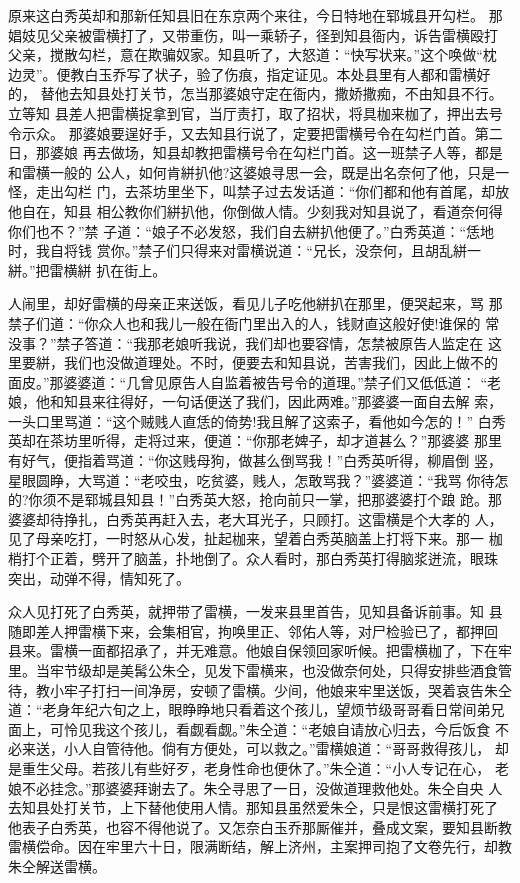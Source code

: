 原来这白秀英却和那新任知县旧在东京两个来往，今日特地在郓城县开勾栏。
那娼妓见父亲被雷横打了，又带重伤，叫一乘轿子，径到知县衙内，诉告雷横殴打
父亲，搅散勾栏，意在欺骗奴家。知县听了，大怒道：“快写状来。”这个唤做“枕
边灵”。便教白玉乔写了状子，验了伤痕，指定证见。本处县里有人都和雷横好的，
替他去知县处打关节，怎当那婆娘守定在衙内，撒娇撒痴，不由知县不行。立等知
县差人把雷横捉拿到官，当厅责打，取了招状，将具枷来枷了，押出去号令示众。
那婆娘要逞好手，又去知县行说了，定要把雷横号令在勾栏门首。第二日，那婆娘
再去做场，知县却教把雷横号令在勾栏门首。这一班禁子人等，都是和雷横一般的
公人，如何肯絣扒他?这婆娘寻思一会，既是出名奈何了他，只是一怪，走出勾栏
门，去茶坊里坐下，叫禁子过去发话道：“你们都和他有首尾，却放他自在，知县
相公教你们絣扒他，你倒做人情。少刻我对知县说了，看道奈何得你们也不？”禁
子道：“娘子不必发怒，我们自去絣扒他便了。”白秀英道：“恁地时，我自将钱
赏你。”禁子们只得来对雷横说道：“兄长，没奈何，且胡乱絣一絣。”把雷横絣
扒在街上。

人闹里，却好雷横的母亲正来送饭，看见儿子吃他絣扒在那里，便哭起来，骂
那禁子们道：“你众人也和我儿一般在衙门里出入的人，钱财直这般好使!谁保的
常没事？”禁子答道：“我那老娘听我说，我们却也要容情，怎禁被原告人监定在
这里要絣，我们也没做道理处。不时，便要去和知县说，苦害我们，因此上做不的
面皮。”那婆婆道：“几曾见原告人自监着被告号令的道理。”禁子们又低低道：
“老娘，他和知县来往得好，一句话便送了我们，因此两难。”那婆婆一面自去解
索，一头口里骂道：“这个贼贱人直恁的倚势!我且解了这索子，看他如今怎的！”
白秀英却在茶坊里听得，走将过来，便道：“你那老婢子，却才道甚么？”那婆婆
那里有好气，便指着骂道：“你这贱母狗，做甚么倒骂我！”白秀英听得，柳眉倒
竖，星眼圆睁，大骂道：“老咬虫，吃贫婆，贱人，怎敢骂我？”婆婆道：“我骂
你待怎的?你须不是郓城县知县！”白秀英大怒，抢向前只一掌，把那婆婆打个踉
跄。那婆婆却待挣扎，白秀英再赶入去，老大耳光子，只顾打。这雷横是个大孝的
人，见了母亲吃打，一时怒从心发，扯起枷来，望着白秀英脑盖上打将下来。那一
枷梢打个正着，劈开了脑盖，扑地倒了。众人看时，那白秀英打得脑浆迸流，眼珠
突出，动弹不得，情知死了。

众人见打死了白秀英，就押带了雷横，一发来县里首告，见知县备诉前事。知
县随即差人押雷横下来，会集相官，拘唤里正、邻佑人等，对尸检验已了，都押回
县来。雷横一面都招承了，并无难意。他娘自保领回家听候。把雷横枷了，下在牢
里。当牢节级却是美髯公朱仝，见发下雷横来，也没做奈何处，只得安排些酒食管
待，教小牢子打扫一间净房，安顿了雷横。少间，他娘来牢里送饭，哭着哀告朱仝
道：“老身年纪六旬之上，眼睁睁地只看着这个孩儿，望烦节级哥哥看日常间弟兄
面上，可怜见我这个孩儿，看觑看觑。”朱仝道：“老娘自请放心归去，今后饭食
不必来送，小人自管待他。倘有方便处，可以救之。”雷横娘道：“哥哥救得孩儿，
却是重生父母。若孩儿有些好歹，老身性命也便休了。”朱仝道：“小人专记在心，
老娘不必挂念。”那婆婆拜谢去了。朱仝寻思了一日，没做道理救他处。朱仝自央
人去知县处打关节，上下替他使用人情。那知县虽然爱朱仝，只是恨这雷横打死了
他表子白秀英，也容不得他说了。又怎奈白玉乔那厮催并，叠成文案，要知县断教
雷横偿命。因在牢里六十日，限满断结，解上济州，主案押司抱了文卷先行，却教
朱仝解送雷横。


